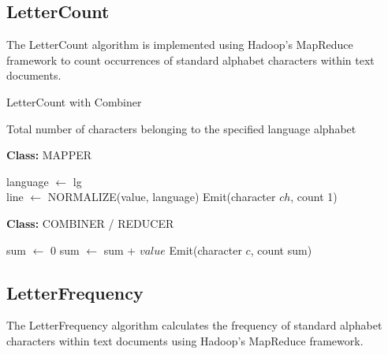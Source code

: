    

\subsection{LetterCount}
The LetterCount algorithm is implemented using Hadoop's MapReduce framework to count occurrences of standard alphabet characters within text documents. \\

\begin{algorithm}
    \caption{LetterCount with Combiner}
    \begin{algorithmic}[1]
        \Ensure Total number of characters belonging to the specified language alphabet

        \Statex \Statex \textbf{Class:} MAPPER

            \State language $\gets$ lg 
        \EndProcedure\\

            \State line $\gets$ NORMALIZE(value, language) 
                \State Emit(character $ch$, count 1) 
            \EndFor
        \EndProcedure

        \Statex \Statex \textbf{Class:} COMBINER / REDUCER

            \State sum $\gets$ 0 
             
                \State sum $\gets$ sum + $value$
            \EndFor
            \State Emit(character $c$, count sum) 
        \EndProcedure

    \end{algorithmic}
\end{algorithm}

\newpage

\subsection{LetterFrequency}
The LetterFrequency algorithm calculates the frequency of standard alphabet characters within text documents using Hadoop's MapReduce framework. \\


